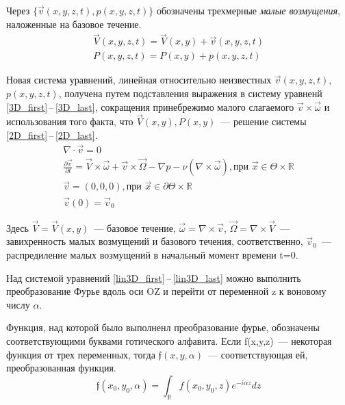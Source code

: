 Через $\{ \vec v(x,y,z,t), p(x,y,z,t) \} $ обозначены трехмерные \textit{малые возмущения}, наложенные на базовое течение. 
\begin{gather*}
  \vec V(x,y,z,t) = \vec V(x,y) + \vec v(x,y,z,t) \\
  P(x,y,z,t) = P(x,y) + p(x,y,z,t)
\end{gather*}

Новая система уравнений, линейная относительно неизвестных $ \vec v(x,y,z,t)$, $p(x,y,z,t) $, получена путем подставления выражения в систему уравненй \ref{3D_first}\,--\,\ref{3D_last}, сокращения принебрежимо малого слагаемого $ \vec v \times \vec \omega $ и использования того факта, что  $\vec V(x,y), P(x,y) $~--- решение системы \ref{2D_first}\,--\,\ref{2D_last}.
\begin{gather} 
  \label{lin3D_first}
  \nabla \cdot \vec v = 0\\
  \frac{\partial \vec v}{\partial t} = \vec V \times \vec \omega + \vec v \times \vec \Omega - \nabla p - \nu ( \nabla \times \vec \omega ), \text{при } \vec x \in \Theta \times \mathbb{R}\\
  \vec v = (0,0,0), \text{при } \vec x \in \partial \Theta \times \mathbb{R} \\
  \vec v (0) = \vec v _0 \label{lin3D_last}
\end{gather}

Здесь $\vec V = \vec V(x,y) $~--- базовое течение, $ \vec \omega = \nabla \times \vec v $, $ \vec \Omega = \nabla \times \vec V $~--- завихренность малых возмущений и базового течения, соответственно, $\vec v_0$~--- распредиление малых возмущений в начальный момент времени t=0. 

Над системой уравнений \ref{lin3D_first}\,--\,\ref{lin3D_last} можно выполнить преобразование Фурье вдоль оси OZ и перейти от переменной z к воновому числу $\alpha$.

Функция, над которой было выполненл преобразование фурье, обозначены соответствующими буквами готического алфавита. Если f(x,y,z)~--- некоторая функция от трех переменных, тогда $ \mathfrak{f}(x,y,\alpha) $~--- соответствующая ей, преобразованная функция.
$$
 \mathfrak{f}(x_0,y_0,\alpha) = \int_\mathbb{R} f(x_0,y_0,z) e^{-i\alpha z} dz 
$$

